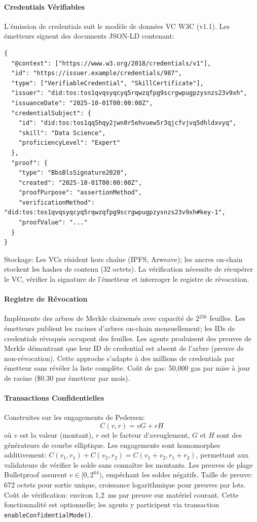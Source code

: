 \documentclass[11pt]{article}
\begin{document}
\paragraph{Credentials Vérifiables} L'émission de credentials suit le modèle de données VC W3C (v1.1). Les émetteurs signent des documents JSON-LD contenant:
\begin{verbatim}
{
  "@context": ["https://www.w3.org/2018/credentials/v1"],
  "id": "https://issuer.example/credentials/987",
  "type": ["VerifiableCredential", "SkillCertificate"],
  "issuer": "did:tos:tos1qvqsyqcyq5rqwzqfpg9scrgwpugpzysnzs23v9xh",
  "issuanceDate": "2025-10-01T00:00:00Z",
  "credentialSubject": {
    "id": "did:tos:tos1qq5hqy2jwn0r5ehvuew5r3qjcfvjvq5dhldxvyq",
    "skill": "Data Science",
    "proficiencyLevel": "Expert"
  },
  "proof": {
    "type": "BbsBlsSignature2020",
    "created": "2025-10-01T00:00:00Z",
    "proofPurpose": "assertionMethod",
    "verificationMethod": "did:tos:tos1qvqsyqcyq5rqwzqfpg9scrgwpugpzysnzs23v9xh#key-1",
    "proofValue": "..."
  }
}
\end{verbatim}
Stockage: Les VCs résident hors chaîne (IPFS, Arweave); les ancres on-chain stockent les hashes de contenu (32 octets). La vérification nécessite de récupérer le VC, vérifier la signature de l'émetteur et interroger le registre de révocation.

\paragraph{Registre de Révocation} Implémente des arbres de Merkle clairsemés avec capacité de 2$^{256}$ feuilles. Les émetteurs publient les racines d'arbres on-chain mensuellement; les IDs de credentials révoqués occupent des feuilles. Les agents produisent des preuves de Merkle démontrant que leur ID de credential est absent de l'arbre (preuve de non-révocation). Cette approche s'adapte à des millions de credentials par émetteur sans révéler la liste complète. Coût de gas: 50,000 gas par mise à jour de racine (\$0.30 par émetteur par mois).

\paragraph{Transactions Confidentielles} Construites sur les engagements de Pedersen:
\begin{equation}
C(v, r) = vG + rH
\end{equation}
où $v$ est la valeur (montant), $r$ est le facteur d'aveuglement, $G$ et $H$ sont des générateurs de courbe elliptique. Les engagements sont homomorphes additivement: $C(v_1, r_1) + C(v_2, r_2) = C(v_1 + v_2, r_1 + r_2)$, permettant aux validateurs de vérifier le solde sans connaître les montants. Les preuves de plage Bulletproof assurent $v \in [0, 2^{64})$, empêchant les soldes négatifs. Taille de preuve: 672 octets pour sortie unique, croissance logarithmique pour preuves par lots. Coût de vérification: environ 1,2~ms par preuve sur matériel courant. Cette fonctionnalité est optionnelle; les agents y participent via transaction \texttt{enableConfidentialMode()}.
\end{document}
